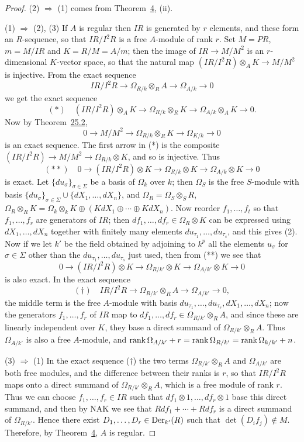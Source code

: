 \begin{proof}
(2) $\Rightarrow$ (1) comes from Theorem~\hyperref[thm:30.4]{4}, (ii).

(1) $\Rightarrow$ (2), (3) If $A$ is regular then $IR$ is generated by $r$ elements, and
these form an $R$-sequence, so that $IR/I^2R$ is a free $A$-module of rank $r$. Set
$M = PR$, $m = M/IR$ and $K = R/M = A/m$; then the image of $IR \to M/M^2$ is an
$r$-dimensional $K$-vector space, so that the natural map $(IR/I^2R) \otimes_A K \to
M/M^2$ is injective. From the exact sequence
\[
  IR/I^2R \to \Omega_{R/k} \otimes_R A \to \Omega_{A/k} \to 0
\]
we get the exact sequence
\[
  (*) \quad (IR/I^2R) \otimes_A K \to \Omega_{R/k} \otimes_R K \to \Omega_{A/k} \otimes_A K \to 0.
\]
Now by Theorem~\hyperref[thm:25.2]{25.2},
\[
  0 \to M/M^2 \to \Omega_{R/k} \otimes_R K \to \Omega_{K/k} \to 0
\]
is an exact sequence. The first arrow in (*) is the composite
$(IR/I^2R) \to M/M^2 \to \Omega_{R/k} \otimes K$, and so is injective. Thus
\[
  (**) \quad 0 \to (IR/I^2R) \otimes K \to \Omega_{R/k} \otimes K \to \Omega_{A/k} \otimes K \to 0
\]
is exact. Let $\{du_\sigma\}_{\sigma \in \Sigma}$ be a basis of $\Omega_k$ over $k$; then $\Omega_S$ is the free
$S$-module with basis $\{du_\sigma\}_{\sigma \in \Sigma} \cup \{dX_1, \ldots, dX_n\}$, and
$\Omega_R = \Omega_S \otimes_S R$, $\Omega_R \otimes_R K = \Omega_k \otimes_k K \oplus
(KdX_1 \oplus \cdots \oplus KdX_n)$. Now reorder $f_1, \ldots, f_t$ so that $f_1, \ldots, f_r$ are
generators of $IR$; then $df_1, \ldots, df_r \in \Omega_R \otimes K$ can be expressed using
$dX_1, \ldots, dX_n$ together with finitely many elements $du_{\tau_1}, \ldots, du_{\tau_s}$, and this
gives (2). Now if we let $k'$ be the field obtained by adjoining to $k^p$ all the
elements $u_\sigma$ for $\sigma \in \Sigma$ other than the $du_{\tau_1}, \ldots, du_{\tau_s}$ just used, then
from (**) we see that
\[
  0 \to (IR/I^2R) \otimes K \to \Omega_{R/k'} \otimes K \to \Omega_{A/k'} \otimes K \to 0
\]
is also exact. In the exact sequence
\[
  (\dagger) \quad IR/I^2R \to \Omega_{R/k'} \otimes_R A \to \Omega_{A/k'} \to 0,
\]
the middle term is the free $A$-module with basis
$du_{\tau_1}, \ldots, du_{\tau_s}, dX_1, \ldots, dX_n$; now the generators $f_1, \ldots, f_r$ of $IR$ map
to $df_1, \ldots, df_r \in \Omega_{R/k'} \otimes_R A$, and since these are linearly independent over
$K$, they base a direct summand of $\Omega_{R/k'} \otimes_R A$. Thus $\Omega_{A/k'}$ is also a
free $A$-module, and $\operatorname{rank} \Omega_{A/k'} + r = \operatorname{rank} \Omega_{R/k'} = \operatorname{rank} \Omega_{k/k'} + n$.

(3) $\Rightarrow$ (1) In the exact sequence ($\dagger$) the two terms
$\Omega_{R/k'} \otimes_R A$ and $\Omega_{A/k'}$ are both free modules, and the difference between
their ranks is $r$, so that $IR/I^2R$ maps onto a direct summand of
$\Omega_{R/k'} \otimes_R A$, which is a free module of rank $r$. Thus we can choose
$f_1, \ldots, f_r \in IR$ such that $df_1 \otimes 1, \ldots, df_r \otimes 1$ base this direct summand,
and then by NAK we see that $Rdf_1 + \cdots + Rdf_r$ is a direct summand of
$\Omega_{R/k'}$. Hence there exist $D_1, \ldots, D_r \in \operatorname{Der}_{k'}(R)$ such that
$\det(D_if_j) \notin M$. Therefore, by Theorem~\hyperref[thm:30.4]{4}, $A$ is regular.
\end{proof}

